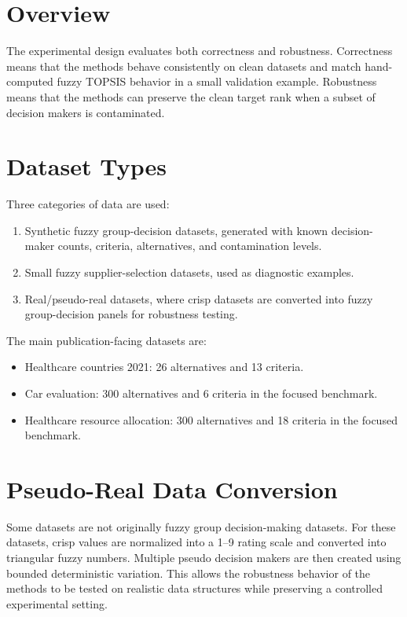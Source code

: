 \section{Overview}

The experimental design evaluates both correctness and robustness. Correctness means that the methods behave consistently on clean datasets and match hand-computed fuzzy TOPSIS behavior in a small validation example. Robustness means that the methods can preserve the clean target rank when a subset of decision makers is contaminated.

\section{Dataset Types}

Three categories of data are used:

\begin{enumerate}
    \item Synthetic fuzzy group-decision datasets, generated with known decision-maker counts, criteria, alternatives, and contamination levels.
    \item Small fuzzy supplier-selection datasets, used as diagnostic examples.
    \item Real/pseudo-real datasets, where crisp datasets are converted into fuzzy group-decision panels for robustness testing.
\end{enumerate}

The main publication-facing datasets are:

\begin{itemize}
    \item Healthcare countries 2021: 26 alternatives and 13 criteria.
    \item Car evaluation: 300 alternatives and 6 criteria in the focused benchmark.
    \item Healthcare resource allocation: 300 alternatives and 18 criteria in the focused benchmark.
\end{itemize}

\section{Pseudo-Real Data Conversion}

Some datasets are not originally fuzzy group decision-making datasets. For these datasets, crisp values are normalized into a 1--9 rating scale and converted into triangular fuzzy numbers. Multiple pseudo decision makers are then created using bounded deterministic variation. This allows the robustness behavior of the methods to be tested on realistic data structures while preserving a controlled experimental setting.

